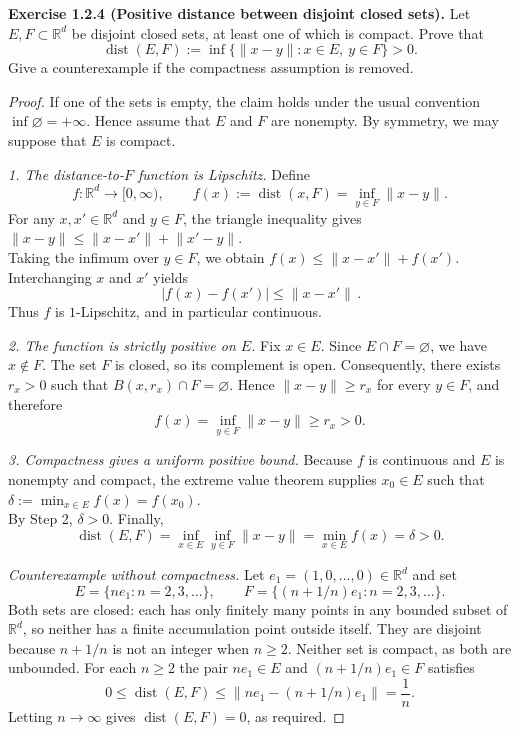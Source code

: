 \noindent\textbf{Exercise 1.2.4 (Positive distance between disjoint closed sets).}
Let $E,F\subset\mathbb R^d$ be disjoint closed sets, at least one of
which is compact. Prove that
\[
\operatorname{dist}(E,F)
:=\inf\{\lVert x-y\rVert:x\in E,\ y\in F\}>0.
\]
Give a counterexample if the compactness assumption is removed.

\begin{proof}
If one of the sets is empty, the claim holds under the usual
convention $\inf\varnothing=+\infty$. Hence assume that $E$ and $F$
are nonempty. By symmetry, we may suppose that $E$ is compact.

\smallskip
\noindent\emph{1. The distance-to-$F$ function is Lipschitz.}
Define
\[
 f:\mathbb R^d\longrightarrow[0,\infty),\qquad
 f(x):=\operatorname{dist}(x,F)
     =\inf_{y\in F}\lVert x-y\rVert.
\]
For any $x,x'\in\mathbb R^d$ and $y\in F$, the triangle inequality gives $\lVert x-y\rVert \le \lVert x-x'\rVert+\lVert x'-y\rVert.$ \\
Taking the infimum over $y\in F$, we obtain
$f(x)\le\lVert x-x'\rVert+f(x')$.
Interchanging $x$ and $x'$ yields
\[
\,|f(x)-f(x')|\le\lVert x-x'\rVert\,.
\]
Thus $f$ is $1$-Lipschitz, and in particular continuous.

\smallskip
\noindent\emph{2. The function is strictly positive on $E$.}
Fix $x\in E$. Since $E\cap F=\varnothing$, we have $x\notin F$.
The set $F$ is closed, so its complement is open. Consequently,
there exists $r_x>0$ such that
$B(x,r_x)\cap F=\varnothing$. Hence
$\lVert x-y\rVert\ge r_x$ for every $y\in F$, and therefore
\[
 f(x)=\inf_{y\in F}\lVert x-y\rVert\ge r_x>0.
\]

\smallskip
\noindent\emph{3. Compactness gives a uniform positive bound.}
Because $f$ is continuous and $E$ is nonempty and compact, the
extreme value theorem supplies $x_0\in E$ such that $\delta:=\min_{x\in E}f(x)=f(x_0).$\\
By Step 2, $\delta>0$. Finally,
\[
\operatorname{dist}(E,F)
=\inf_{x\in E}\inf_{y\in F}\lVert x-y\rVert
=\min_{x\in E}f(x)
=\delta>0.
\]

\smallskip
\noindent\emph{Counterexample without compactness.}
Let $e_1=(1,0,\ldots,0)\in\mathbb R^d$ and set
\[
 E=\{ne_1:n=2,3,\ldots\},\qquad
 F=\{(n+1/n)e_1:n=2,3,\ldots\}.
\]
Both sets are closed: each has only finitely many points in any
bounded subset of $\mathbb R^d$, so neither has a finite accumulation
point outside itself. They are disjoint because $n+1/n$ is not an
integer when $n\ge2$. Neither set is compact, as both are unbounded.
For each $n\ge2$ the pair $ne_1\in E$ and
$(n+1/n)e_1\in F$ satisfies
\[
0\le\operatorname{dist}(E,F)
\le\bigl\lVert ne_1-(n+1/n)e_1\bigr\rVert
=\frac1n.
\]
Letting $n\to\infty$ gives
$\operatorname{dist}(E,F)=0$, as required.
\end{proof}
